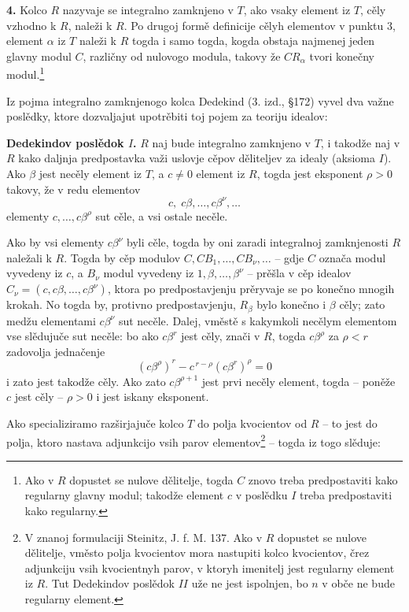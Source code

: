 \documentclass[11pt]{article}
\begin{document}
\textbf{4.} Kolco $R$ nazyvaje se integralno zamknjeno v $T$, ako vsaky element iz $T$, cěly vzhodno k $R$, naleži k $R$. Po drugoj formě definicije cělyh elementov v punktu 3, element $\alpha$ iz $T$ naleži k $R$ togda i samo togda, kogda obstaja najmenej jeden glavny modul $C$, različny od nulovogo modula, takovy že $CR_\alpha$ tvori konečny modul.\footnote{Ako v $R$ dopustet se nulove dělitelje, togda $C$ znovo treba predpostaviti kako regularny glavny modul; takodže element $c$ v poslědku $I$ treba predpostaviti kako regularny.}

Iz pojma integralno zamknjenogo kolca Dedekind (3. izd., §172) vyvel dva važne poslědky, ktore dozvaljajut upotrěbiti toj pojem za teoriju idealov:

\medskip
\noindent\textbf{Dedekindov poslědok $I$.} $R$ naj bude integralno zamknjeno v $T$, i takodže naj v $R$ kako daljnja predpostavka važi uslovje cěpov děliteljev za idealy (aksioma $I$). Ako $\beta$ jest necěly element iz $T$, a $c\ne0$ element iz $R$, togda jest eksponent $\rho>0$ takovy, že v redu elementov
\[
        c,\;c\beta,\ldots,c\beta^\nu,\ldots
\]
elementy $c,\ldots,c\beta^\rho$ sut cěle, a vsi ostale necěle.

Ako by vsi elementy $c\beta^\nu$ byli cěle, togda by oni zaradi integralnoj zamknjenosti $R$ naležali k $R$. Togda by cěp modulov $C,CB_1,\ldots,CB_\nu,\ldots$ -- gdje $C$ označa modul vyvedeny iz $c$, a $B_\nu$ modul vyvedeny iz $1,\beta,\ldots,\beta^\nu$ -- prěšla v cěp idealov $C_\nu=(c,c\beta,\ldots,c\beta^\nu)$, ktora po predpostavjenju prěryvaje se po konečno mnogih krokah. No togda by, protivno predpostavjenju, $R_\beta$ bylo konečno i $\beta$ cěly; zato medžu elementami $c\beta^\nu$ sut necěle. Dalej, vměstě s kakymkoli necělym elementom vse slědujuče sut necěle: bo ako $c\beta^r$ jest cěly, znači v $R$, togda $c\beta^\rho$ za $\rho<r$ zadovolja jednačenje
\[
        (c\beta^\rho)^r-c^{\,r-\rho}(c\beta^r)^\rho=0
\]
i zato jest takodže cěly. Ako zato $c\beta^{\rho+1}$ jest prvi necěly element, togda -- poněže $c$ jest cěly -- $\rho>0$ i jest iskany eksponent.

Ako specializiramo razširjajuče kolco $T$ do polja kvocientov od $R$ -- to jest do polja, ktoro nastava adjunkcijo vsih parov elementov\footnote{V znanoj formulaciji Steinitz, J. f. M. 137. Ako v $R$ dopustet se nulove dělitelje, vměsto polja kvocientov mora nastupiti kolco kvocientov, črez adjunkciju vsih kvocientnyh parov, v ktoryh imenitelj jest regularny element iz $R$. Tut Dedekindov poslědok $II$ uže ne jest ispolnjen, bo $n$ v obče ne bude regularny element.} -- togda iz togo slěduje:
\end{document}
